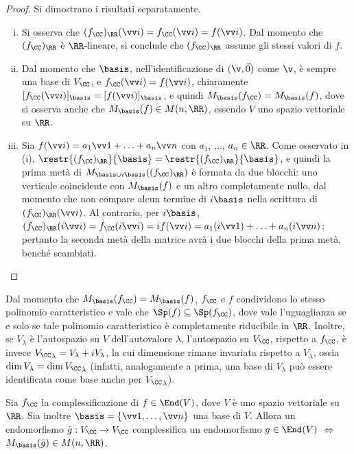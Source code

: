 \begin{proof}Si dimostrano i risultati separatamente.
	\begin{enumerate}[(i)]
		\item Si osserva che $(f_\CC)_\RR(\vv i) = f_\CC(\vv i) = f(\vv i)$. Dal momento che
		$(f_\CC)_\RR$ è $\RR$-lineare, si conclude che $(f_\CC)_\RR$ assume gli stessi valori
		di $f$.
		
		\item Dal momento che $\basis$, nell'identificazione di $(\v, \vec 0)$ come $\v$, è
		sempre una base di $V_\CC$, e $f_\CC(\vv i) = f(\vv i)$, chiaramente
		$[f_\CC(\vv i)]_\basis = [f(\vv i)]_\basis$, e quindi $M_\basis(f_\CC) = M_\basis(f)$,
		dove si osserva anche che $M_\basis(f) \in M(n, \RR)$, essendo $V$ uno spazio vettoriale
		su $\RR$.
		
		\item Sia $f(\vv i) = a_1 \vv 1 + \ldots + a_n \vv n$ con $a_1$, ..., $a_n \in \RR$. Come
		osservato in (i), $\restr{(f_\CC)_\RR}{\basis} = \restr{(f_\CC)_\RR}{\basis}$, e quindi
		la prima metà di $M_{\basis \cup i \basis}((f_\CC)_\RR)$ è formata da due blocchi: uno
		verticale coincidente con $M_\basis(f)$ e un altro completamente nullo, dal momento che
		non compare alcun termine di $i \basis$ nella scrittura di $(f_\CC)_\RR(\vv i)$. Al
		contrario, per $i \basis$, $(f_\CC)_\RR(i \vv i) = f_\CC(i \vv i) = i f(\vv i) = a_1 (i \vv 1) +
		\ldots + a_n (i \vv n)$; pertanto la seconda metà della matrice avrà i due blocchi della prima metà,
		benché scambiati.
	\end{enumerate}
\end{proof}

\begin{remark}
	Dal momento che $M_\basis(f_\CC) = M_\basis(f)$, $f_\CC$ e $f$ condividono lo stesso polinomio caratteristico
	e vale che $\Sp(f) \subseteq \Sp(f_\CC)$, dove vale l'uguaglianza se e solo se tale polinomio caratteristico
	è completamente riducibile in $\RR$. Inoltre, se $V_\lambda$ è l'autospazio su $V$ dell'autovalore $\lambda$, l'autospazio
	su $V_\CC$, rispetto a $f_\CC$, è invece ${V_\CC}_\lambda = V_\lambda + i V_\lambda$, la cui
	dimensione rimane invariata rispetto a $V_\lambda$, ossia $\dim V_\lambda = \dim {V_\CC}_\lambda$
	(infatti, analogamente a prima, una base di $V_\lambda$ può essere identificata come base
	anche per ${V_\CC}_\lambda$).
\end{remark}

\begin{proposition}
	Sia $f_\CC$ la complessificazione di $f \in \End(V)$, dove $V$ è uno spazio vettoriale su $\RR$.
	Sia inoltre $\basis = \{ \vv 1, \ldots, \vv n \}$ una base di $V$. Allora un endomorfismo
	$\tilde g : V_\CC \to V_\CC$ complessifica un endomorfismo $g \in \End(V)$ $\iff$ $M_\basis(\tilde g) \in M(n, \RR)$.
\end{proposition}

